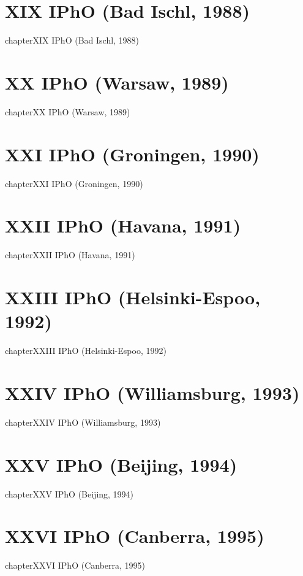 \documentclass[12pt,a4paper]{book}
\begin{document}
\chapter*{XIX IPhO (Bad Ischl, 1988)}
{chapter}{XIX IPhO (Bad Ischl, 1988)}
\chapter*{XX IPhO (Warsaw, 1989)}
{chapter}{XX IPhO (Warsaw, 1989)}
\chapter*{XXI IPhO (Groningen, 1990)}
{chapter}{XXI IPhO (Groningen, 1990)}
\chapter*{XXII IPhO (Havana, 1991)}
{chapter}{XXII IPhO (Havana, 1991)}
\chapter*{XXIII IPhO (Helsinki-Espoo, 1992)}
{chapter}{XXIII IPhO (Helsinki-Espoo, 1992)}
\chapter*{XXIV IPhO (Williamsburg, 1993)}
{chapter}{XXIV IPhO (Williamsburg, 1993)}
\chapter*{XXV IPhO (Beijing, 1994)}
{chapter}{XXV IPhO (Beijing, 1994)}
\chapter*{XXVI IPhO (Canberra, 1995)}
{chapter}{XXVI IPhO (Canberra, 1995)}
\end{document}
